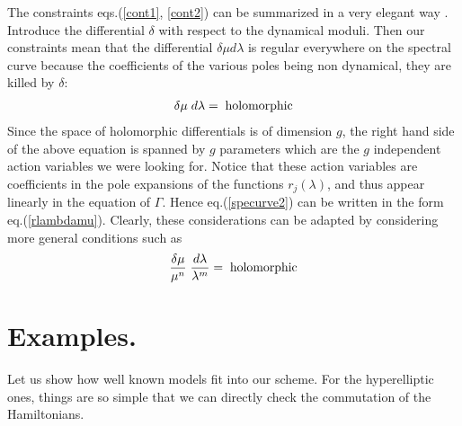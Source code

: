 \documentclass[a4paper,11pt]{article}
\begin{document}
The constraints eqs.(\ref{cont1}, \ref{cont2}) can be summarized in a very elegant
way \cite{KrPh97, BaBeTa03}. 
Introduce the differential $\delta$ with respect to the dynamical moduli. 
Then our constraints mean that  the differential 
$\delta \mu d\lambda$ is regular everywhere on the spectral curve because the coefficients of the various poles being non dynamical, they are killed by $\delta$:
\begin{eqnarray*}
\delta \mu \;d\lambda =\;{\rm holomorphic}
\end{eqnarray*}
Since the space of holomorphic differentials is of dimension $g$, the right hand side
of the above equation is spanned by $g$ parameters which are the $g$ independent 
action variables we were looking for. Notice that these action variables are coefficients 
in the pole expansions of the functions $r_j(\lambda)$, and thus appear linearly 
in the equation of $\Gamma$. Hence eq.(\ref{specurve2}) can be written in the form
eq.(\ref{rlambdamu}). Clearly, these considerations can  be adapted  
by considering more general conditions such as
\begin{eqnarray*}
{\delta \mu \over \mu^n} \;{d\lambda\over \lambda^m} =\;{\rm holomorphic}
\end{eqnarray*}





\section{Examples.}
Let us show how well known models fit into our scheme. For the 
hyperelliptic ones, things are so simple that we can directly check
the commutation of the Hamiltonians.
\end{document}
